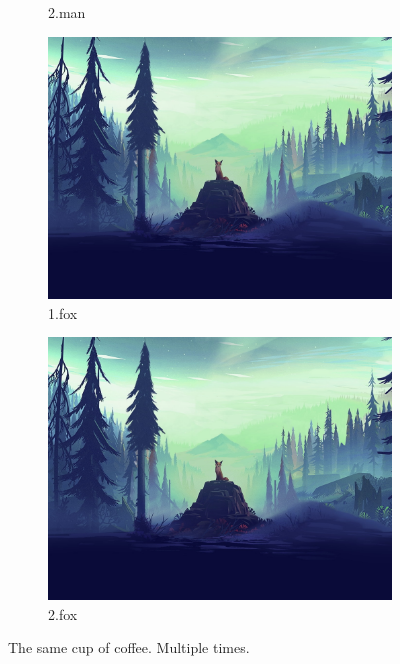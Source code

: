 \documentclass{article}
\begin{document}
\begin{figure}[h!]
\begin{subfigure}[b]{0.2\linewidth}
    \caption{2.man}
  \end{subfigure}
  \begin{subfigure}[b]{0.2\linewidth}
    \includegraphics[width=\linewidth]{fox.jpg}
    \caption{1.fox}
  \end{subfigure}
  \begin{subfigure}[b]{0.5\linewidth}
    \includegraphics[width=\linewidth]{fox.jpg}
    \caption{2.fox}
  \end{subfigure}
  
  
  \caption{The same cup of coffee. Multiple times.}
  \label{fig:coffee3}
\end{figure}
\end{document}
